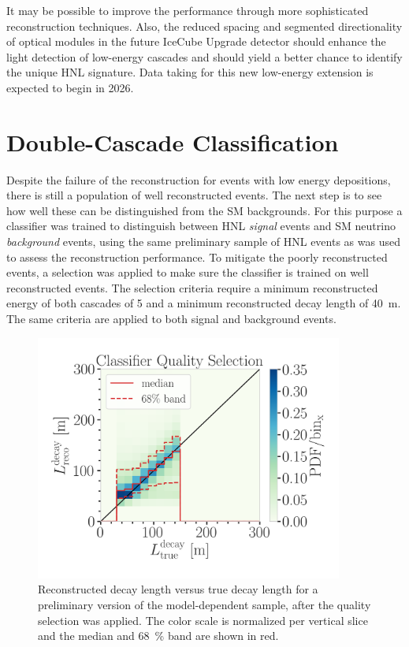 It may be possible to improve the performance through more sophisticated reconstruction techniques. Also, the reduced spacing and segmented directionality of optical modules in the future IceCube Upgrade detector should enhance the light detection of low-energy cascades and should yield a better chance to identify the unique HNL signature. Data taking for this new low-energy extension is expected to begin in 2026.


\section{Double-Cascade Classification} 

Despite the failure of the reconstruction for events with low energy depositions, there is still a population of well reconstructed events. The next step is to see how well these can be distinguished from the SM backgrounds. For this purpose a classifier was trained to distinguish between HNL \textit{signal} events and SM neutrino \textit{background} events, using the same preliminary sample of HNL events as was used to assess the reconstruction performance. To mitigate the poorly reconstructed events, a selection was applied to make sure the classifier is trained on well reconstructed events. The selection criteria require a minimum reconstructed energy of both cascades of \SI{5}{\gev} and a minimum reconstructed decay length of \SI{40}{\meter}. The same criteria are applied to both signal and background events.

\begin{figure}[h]
    \centering
    \includegraphics[width=0.9\textwidth]{figures/results/190607/classification/reco_decayL_vs_true_decayL_reco_energy_cut_and_reco_length_cut_and_true_energy_cut_and_true_length_cut_step_contours.png}
    \caption[Reconstructed decay length resolution versus true decay length after quality selection - preliminary model-dependent sample]{Reconstructed decay length versus true decay length for a preliminary version of the model-dependent sample, after the quality selection was applied. The color scale is normalized per vertical slice and the median and \SI{68}{\percent} band are shown in red.}
\end{figure}

